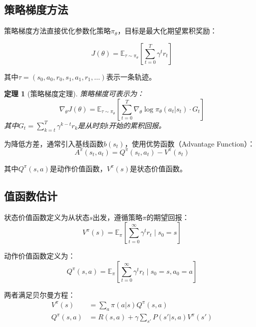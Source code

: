\documentclass[12pt,a4paper]{article}
\newtheorem{theorem}{定理}[section]
\begin{document}
\subsection{策略梯度方法}

策略梯度方法直接优化参数化策略$\pi_\theta$，目标是最大化期望累积奖励：

\begin{equation}
J(\theta) = \mathbb{E}_{\tau \sim \pi_\theta}\left[\sum_{t=0}^{T} \gamma^t r_t\right]
\end{equation}

其中$\tau = (s_0, a_0, r_0, s_1, a_1, r_1, \ldots)$表示一条轨迹。

\begin{theorem}[策略梯度定理]
策略梯度可表示为：
\begin{equation}
\nabla_\theta J(\theta) = \mathbb{E}_{\tau \sim \pi_\theta}\left[\sum_{t=0}^{T} \nabla_\theta \log \pi_\theta(a_t|s_t) \cdot G_t\right]
\end{equation}
其中$G_t = \sum_{k=t}^{T} \gamma^{k-t} r_k$是从时刻$t$开始的累积回报。
\end{theorem}

为降低方差，通常引入基线函数$b(s_t)$，使用优势函数（Advantage Function）：
\begin{equation}
A^{\pi}(s_t, a_t) = Q^{\pi}(s_t, a_t) - V^{\pi}(s_t)
\end{equation}

其中$Q^{\pi}(s,a)$是动作价值函数，$V^{\pi}(s)$是状态价值函数。

\subsection{值函数估计}

状态价值函数定义为从状态$s$出发，遵循策略$\pi$的期望回报：
\begin{equation}
V^{\pi}(s) = \mathbb{E}_{\pi}\left[\sum_{t=0}^{\infty} \gamma^t r_t \mid s_0 = s\right]
\end{equation}

动作价值函数定义为：
\begin{equation}
Q^{\pi}(s, a) = \mathbb{E}_{\pi}\left[\sum_{t=0}^{\infty} \gamma^t r_t \mid s_0 = s, a_0 = a\right]
\end{equation}

两者满足贝尔曼方程：
\begin{align}
V^{\pi}(s) &= \sum_a \pi(a|s) Q^{\pi}(s, a) \\
Q^{\pi}(s, a) &= R(s, a) + \gamma \sum_{s'} P(s'|s, a) V^{\pi}(s')
\end{align}
\end{document}

